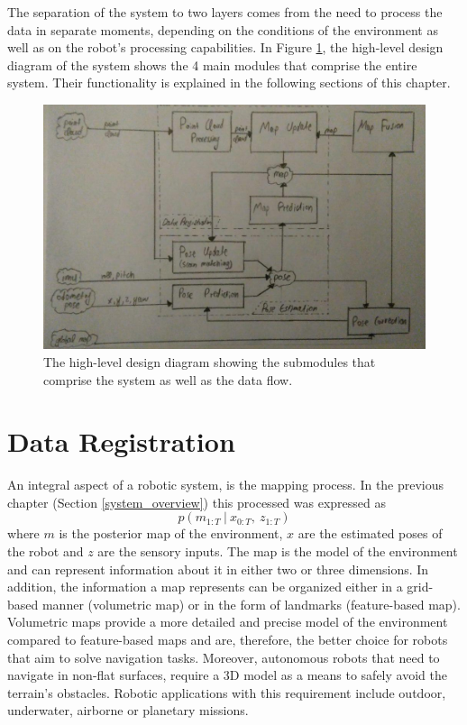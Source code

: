 The separation of the system to two layers comes from the need to process the
data in separate moments, depending on the conditions of the environment as
well as on the robot's processing capabilities.
In Figure \ref{fig:HLD}, the high-level design diagram of the system shows
the 4 main modules that comprise the entire system.
Their functionality is explained in the following sections of this chapter.

\begin{figure}[th]
    \centering
    \includegraphics[scale=0.4]{Figures/high_level_design_diagram}
    \decoRule
    \caption[High Level Design Diagram]{
        The high-level design diagram showing the submodules that comprise
        the system as well as the data flow.}
    \label{fig:HLD}
\end{figure}

\section{Data Registration}

An integral aspect of a robotic system, is the mapping process.
In the previous chapter (Section \ref{system_overview}) this processed
was expressed as
\begin{equation}
    p(m_{1:T} \ | \ x_{0:T} ,\ z_{1:T})
\end{equation}
where
$m$ is the posterior map of the environment,
$x$ are the estimated poses of the robot and
$z$ are the sensory inputs.
The map is the model of the environment and can represent information about
it in either two or three dimensions.
In addition, the information a map represents can be organized either in
a grid-based manner (volumetric map) or in the form of landmarks
(feature-based map).
Volumetric maps provide a more detailed and precise model of the environment
compared to feature-based maps and are, therefore, the better choice for
robots that aim to solve navigation tasks.
Moreover, autonomous robots that need to navigate in non-flat surfaces,
require a 3D model as a means to safely avoid the terrain's obstacles.
Robotic applications with this requirement include outdoor, underwater,
airborne or planetary missions.

